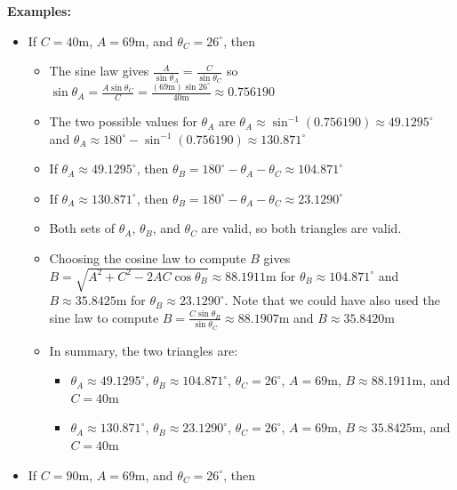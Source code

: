 \documentclass{article}
\begin{document}
{\bf Examples:}
\begin{itemize}
\item If \(C = 40\text{m}\), \(A = 69\text{m}\), and \(\theta_C = 26^\circ\), then 
	\begin{itemize}
	\item[\textasteriskcentered] The sine law gives \(\frac{A}{\sin\theta_A} = \frac{C}{\sin\theta_C}\) so \(\sin\theta_A = \frac{A\sin\theta_C}{C} = \frac{(69\text{m})\sin 26^\circ}{40\text{m}} \approx 0.756190\)
	\item[\textasteriskcentered] The two possible values for \(\theta_A\) are \(\theta_A \approx \sin^{-1}(0.756190) \approx 49.1295^\circ\) and \(\theta_A \approx 180^\circ - \sin^{-1}(0.756190) \approx 130.871^\circ\)
	\item[\textasteriskcentered] If \(\theta_A \approx 49.1295^\circ\), then \(\theta_B = 180^\circ - \theta_A - \theta_C \approx 104.871^\circ\) 
	\item[\textasteriskcentered] If \(\theta_A \approx 130.871^\circ\), then \(\theta_B = 180^\circ - \theta_A - \theta_C \approx 23.1290^\circ\) 
	\item[\textasteriskcentered] Both sets of \(\theta_A\), \(\theta_B\), and \(\theta_C\) are valid, so both triangles are valid.
	\item[\textasteriskcentered] Choosing the cosine law to compute \(B\) gives \(B = \sqrt{A^2 + C^2 - 2AC\cos\theta_B} \approx 88.1911\text{m}\) for \(\theta_B \approx 104.871^\circ\) and \(B \approx 35.8425\text{m}\) for \(\theta_B \approx 23.1290^\circ\). Note that we could have also used the sine law to compute \(B = \frac{C\sin\theta_B}{\sin\theta_C} \approx 88.1907\text{m}\) and \(B \approx 35.8420\text{m}\) 
	\item[\textasteriskcentered] In summary, the two triangles are: 
		\begin{itemize}
		\item \(\theta_A \approx 49.1295^\circ\), \(\theta_B \approx 104.871^\circ\), \(\theta_C = 26^\circ\), \(A = 69\text{m}\), \(B \approx 88.1911\text{m}\), and \(C = 40\text{m}\)
		\item \(\theta_A \approx 130.871^\circ\), \(\theta_B \approx 23.1290^\circ\), \(\theta_C = 26^\circ\), \(A = 69\text{m}\), \(B \approx 35.8425\text{m}\), and \(C = 40\text{m}\)
		\end{itemize}
	\end{itemize}
\item If \(C = 90\text{m}\), \(A = 69\text{m}\), and \(\theta_C = 26^\circ\), then 

\end{itemize}
\end{document}

